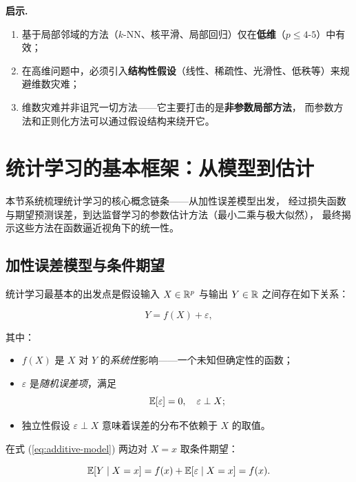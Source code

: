 \textbf{启示.}
\begin{enumerate}[label=(\arabic*)]
    \item 基于局部邻域的方法（$k$-NN、核平滑、局部回归）仅在\textbf{低维}（$p \le 4$-$5$）中有效；
    \item 在高维问题中，必须引入\textbf{结构性假设}（线性、稀疏性、光滑性、低秩等）来规避维数灾难；
    \item 维数灾难并非诅咒一切方法——它主要打击的是\textbf{非参数局部方法}，
    而参数方法和正则化方法可以通过假设结构来绕开它。
\end{enumerate}

\section{统计学习的基本框架：从模型到估计}
\label{sec:stat-learning-framework}

本节系统梳理统计学习的核心概念链条——从加性误差模型出发，
经过损失函数与期望预测误差，到达监督学习的参数估计方法（最小二乘与极大似然），
最终揭示这些方法在函数逼近视角下的统一性。

\subsection{加性误差模型与条件期望}

统计学习最基本的出发点是假设输入 $X \in \mathbb{R}^p$ 与输出 $Y \in \mathbb{R}$ 之间存在如下关系：

\begin{equation}\label{eq:additive-model}
    Y = f(X) + \varepsilon,
\end{equation}

其中：
\begin{itemize}
    \item $f(X)$ 是 $X$ 对 $Y$ 的\emph{系统性}影响——一个未知但确定性的函数；
    \item $\varepsilon$ 是\emph{随机误差项}，满足
    \begin{equation}
        \mathbb{E}[\varepsilon] = 0,\quad \varepsilon \perp X;
    \end{equation}
    \item 独立性假设 $\varepsilon \perp X$ 意味着误差的分布不依赖于 $X$ 的取值。
\end{itemize}

在式 (\ref{eq:additive-model}) 两边对 $X = x$ 取条件期望：

\begin{equation}\label{eq:cond-mean}
    \mathbb{E}[Y \mid X = x] = f(x) + \mathbb{E}[\varepsilon \mid X = x] = f(x).
\end{equation}

